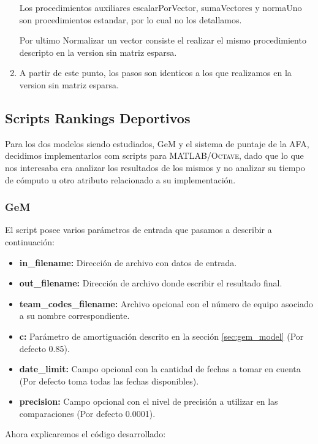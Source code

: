 \begin{enumerate}
	Los procedimientos auxiliares escalarPorVector, sumaVectores y normaUno son procedimientos estandar, por lo cual no los detallamos.

	Por ultimo Normalizar un vector consiste el realizar el mismo procedimiento descripto en la version sin matriz esparsa.
	\item A partir de este punto, los pasos son identicos a los que realizamos en la version sin matriz esparsa.

\end{enumerate}

\subsection{Scripts Rankings Deportivos}

Para los dos modelos siendo estudiados, GeM y el sistema de puntaje de la AFA,
decidimos implementarlos com scripts para \textsc{MATLAB/Octave}, dado que lo que nos
interesaba era analizar los resultados de los mismos y no analizar su tiempo de
cómputo u otro atributo relacionado a su implementación.

\subsubsection{GeM}

El script posee varios parámetros de entrada que pasamos a describir a
continuación:

\begin{itemize}
	\item \textbf{in_filename:} Dirección de archivo con datos de entrada.
	\item \textbf{out_filename:} Dirección de archivo donde escribir el
	resultado final.
	\item \textbf{team_codes_filename:} Archivo opcional con el número de equipo
	asociado a su nombre correspondiente.
	\item \textbf{c:} Parámetro de amortiguación descrito en la
	sección \ref{sec:gem_model} (Por defecto 0.85).
	\item \textbf{date_limit:} Campo opcional con la cantidad de fechas a tomar
	en cuenta (Por defecto toma todas las fechas disponibles).
\item \textbf{precision:} Campo opcional con el nivel de precisión a utilizar en
	las comparaciones (Por defecto 0.0001).
\end{itemize}

Ahora explicaremos el código desarrollado:

